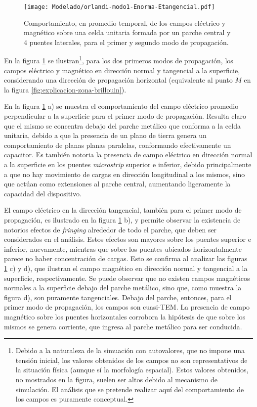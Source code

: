 \begin{figure}[h]
	\centering
	\texttt{[image: Modelado/orlandi-modo1-Enorma-Etangencial.pdf]}
	\caption{Comportamiento, en promedio temporal, de los campos eléctrico y magnético sobre una celda unitaria formada por un parche central y 4 puentes laterales, para el primer y segundo modo de propagación.}
	\label{fig:orlandi-analisis-campos}
\end{figure}

En la figura \ref{fig:orlandi-analisis-campos} se ilustran\footnote{Debido a la naturaleza de la simuación con autovalores, que no impone una tensión inicial, los valores obtenidos de los campos no son representativos de la situación física (aunque sí la morfología espacial). Estos valores obtenidos, no mostrados en la figura, suelen ser altos debido al mecanismo de simulación. El análisis que se pretende realizar aquí del comportamiento de los campos es puramente conceptual.}, para los dos primeros modos de propagación, los campos eléctrico y magnético en dirección normal y tangencial a la superficie, considerando una dirección de propagación horizontal (equivalente al punto $M$ en la figura \ref{fig:explicacion-zona-brillouin}).

En la figura \ref{fig:orlandi-analisis-campos} a) se muestra el comportamiento del campo eléctrico promedio perpendicular a la superficie para el primer modo de propagación. Resulta claro que el mismo se concentra debajo del parche metálico que conforma a la celda unitaria, debido a que la presencia de un plano de tierra genera un comportamiento de planas planas paralelas, conformando efectivamente un capacitor. Es también notoria la presencia de campo eléctrico en dirección normal a la superficie en los puentes \textit{microstrip} superior e inferior, debido principalmente a que no hay movimiento de cargas en dirección longitudinal a los mismos, sino que actúan como extensiones al parche central, aumentando ligeramente la capacidad del dispositivo.

El campo eléctrico en la dirección tangencial, también para el primer modo de propagación, es ilustrado en la figura \ref{fig:orlandi-analisis-campos} b), y permite observar la existencia de notorios efectos de \textit{fringing} alrededor de todo el parche, que deben ser considerados en el análisis. Estos efectos son mayores sobre los puentes superior e inferior, nuevamente, mientras que sobre los puentes ubicados horizontalmente parece no haber concentración de cargas. Esto se confirma al analizar las figuras \ref{fig:orlandi-analisis-campos} c) y d), que ilustran el campo magnético en dirección normal y tangencial a la superficie, respectivamente. Se puede observar que no existen campos magnéticos normales a la superficie debajo del parche metálico, sino que, como muestra la figura d), son puramente tangenciales. Debajo del parche, entonces, para el primer modo de propagación, los campos son cuasi-TEM. La presencia de campo magnético sobre los puentes horizontales corrobora la hipótesis de que sobre los mismos se genera corriente, que ingresa al parche metálico para ser conducida.


